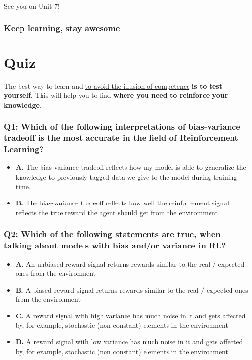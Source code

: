 \documentclass[11pt,a4paper]{article}
\begin{document}
See you on Unit 7!

\subsubsection{Keep learning, stay awesome}\label{keep-learning-stay-awesome}

\section{Quiz}\label{quiz}

The best way to learn and \href{https://www.coursera.org/lecture/learning-how-to-learn/illusions-of-competence-BuFzf}{to avoid the illusion of competence} \textbf{is to test yourself.} This will help you to find \textbf{where you need to reinforce your knowledge}.

\subsubsection{Q1: Which of the following interpretations of bias-variance tradeoff is the most accurate in the field of Reinforcement Learning?}\label{q1-which-of-the-following-interpretations-of-bias-variance-tradeoff-is-the-most-accurate-in-the-field-of-reinforcement-learning}

\begin{itemize}
\tightlist
\item
  \textbf{A.} The bias-variance tradeoff reflects how my model is able to generalize the knowledge to previously tagged data we give to the model during training time.
\item
  \textbf{B.} The bias-variance tradeoff reflects how well the reinforcement signal reflects the true reward the agent should get from the enviromment
\end{itemize}

\subsubsection{Q2: Which of the following statements are true, when talking about models with bias and/or variance in RL?}\label{q2-which-of-the-following-statements-are-true-when-talking-about-models-with-bias-andor-variance-in-rl}

\begin{itemize}
\tightlist
\item
  \textbf{A.} An unbiased reward signal returns rewards similar to the real / expected ones from the environment
\item
  \textbf{B.} A biased reward signal returns rewards similar to the real / expected ones from the environment
\item
  \textbf{C.} A reward signal with high variance has much noise in it and gets affected by, for example, stochastic (non constant) elements in the environment
\item
  \textbf{D.} A reward signal with low variance has much noise in it and gets affected by, for example, stochastic (non constant) elements in the environment
\end{itemize}
\end{document}
